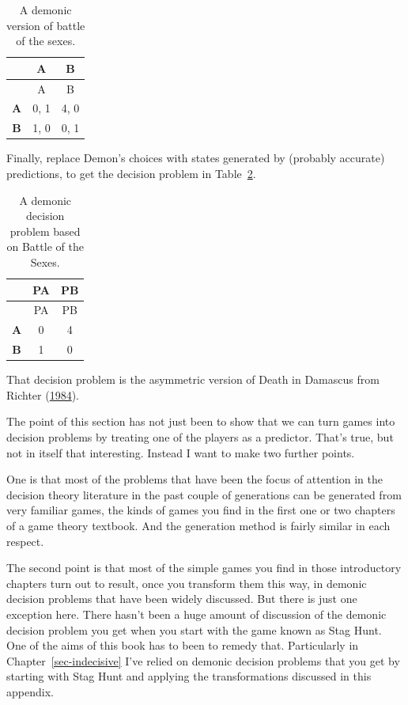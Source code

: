 \documentclass[
  12pt,
  letterpaper,
  DIV=11,
  numbers=noendperiod]{scrreprt}
\begin{document}
\hypertarget{tbl-bach-demon}{}
\begin{longtable}[]{@{}ccc@{}}
\caption{\label{tbl-bach-demon}A demonic version of battle of the
sexes.}\tabularnewline
\toprule\noalign{}
& A & B \\
\midrule\noalign{}
\endfirsthead
\toprule\noalign{}
& A & B \\
\midrule\noalign{}
\endhead
\bottomrule\noalign{}
\endlastfoot
\textbf{A} & 0, 1 & 4, 0 \\
\textbf{B} & 1, 0 & 0, 1 \\
\end{longtable}

Finally, replace Demon's choices with states generated by (probably
accurate) predictions, to get the decision problem in
Table~\ref{tbl-asymm-death-damascus}.

\hypertarget{tbl-asymm-death-damascus}{}
\begin{longtable}[]{@{}ccc@{}}
\caption{\label{tbl-asymm-death-damascus}A demonic decision problem
based on Battle of the Sexes.}\tabularnewline
\toprule\noalign{}
& PA & PB \\
\midrule\noalign{}
\endfirsthead
\toprule\noalign{}
& PA & PB \\
\midrule\noalign{}
\endhead
\bottomrule\noalign{}
\endlastfoot
\textbf{A} & 0 & 4 \\
\textbf{B} & 1 & 0 \\
\end{longtable}

That decision problem is the asymmetric version of Death in Damascus
from Richter (\protect\hyperlink{ref-Richter1984}{1984}).

The point of this section has not just been to show that we can turn
games into decision problems by treating one of the players as a
predictor. That's true, but not in itself that interesting. Instead I
want to make two further points.

One is that most of the problems that have been the focus of attention
in the decision theory literature in the past couple of generations can
be generated from very familiar games, the kinds of games you find in
the first one or two chapters of a game theory textbook. And the
generation method is fairly similar in each respect.

The second point is that most of the simple games you find in those
introductory chapters turn out to result, once you transform them this
way, in demonic decision problems that have been widely discussed. But
there is just one exception here. There hasn't been a huge amount of
discussion of the demonic decision problem you get when you start with
the game known as Stag Hunt. One of the aims of this book has to been to
remedy that. Particularly in Chapter~\ref{sec-indecisive} I've relied on
demonic decision problems that you get by starting with Stag Hunt and
applying the transformations discussed in this appendix.
\end{document}
